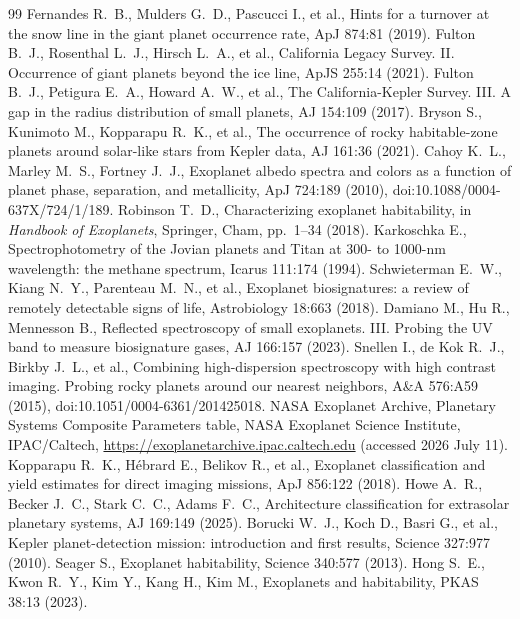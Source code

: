 \begin{thebibliography}{99}
 Fernandes R.~B., Mulders G.~D., Pascucci I., et al., Hints for a turnover at the snow line in the giant planet occurrence rate, ApJ 874:81 (2019).
 Fulton B.~J., Rosenthal L.~J., Hirsch L.~A., et al., California Legacy Survey. II. Occurrence of giant planets beyond the ice line, ApJS 255:14 (2021).
 Fulton B.~J., Petigura E.~A., Howard A.~W., et al., The California-Kepler Survey. III. A gap in the radius distribution of small planets, AJ 154:109 (2017).
 Bryson S., Kunimoto M., Kopparapu R.~K., et al., The occurrence of rocky habitable-zone planets around solar-like stars from Kepler data, AJ 161:36 (2021).
 Cahoy K.~L., Marley M.~S., Fortney J.~J., Exoplanet albedo spectra and colors as a function of planet phase, separation, and metallicity, ApJ 724:189 (2010), doi:10.1088/0004-637X/724/1/189.
 Robinson T.~D., Characterizing exoplanet habitability, in \emph{Handbook of Exoplanets}, Springer, Cham, pp.~1--34 (2018).
 Karkoschka E., Spectrophotometry of the Jovian planets and Titan at 300- to 1000-nm wavelength: the methane spectrum, Icarus 111:174 (1994).
 Schwieterman E.~W., Kiang N.~Y., Parenteau M.~N., et al., Exoplanet biosignatures: a review of remotely detectable signs of life, Astrobiology 18:663 (2018).
 Damiano M., Hu R., Mennesson B., Reflected spectroscopy of small exoplanets. III. Probing the UV band to measure biosignature gases, AJ 166:157 (2023).
 Snellen I., de Kok R.~J., Birkby J.~L., et al., Combining high-dispersion spectroscopy with high contrast imaging. Probing rocky planets around our nearest neighbors, A\&A 576:A59 (2015), doi:10.1051/0004-6361/201425018.
 NASA Exoplanet Archive, Planetary Systems Composite Parameters table, NASA Exoplanet Science Institute, IPAC/Caltech, \url{https://exoplanetarchive.ipac.caltech.edu} (accessed 2026 July 11).
 Kopparapu R.~K., H\'{e}brard E., Belikov R., et al., Exoplanet classification and yield estimates for direct imaging missions, ApJ 856:122 (2018).
 Howe A.~R., Becker J.~C., Stark C.~C., Adams F.~C., Architecture classification for extrasolar planetary systems, AJ 169:149 (2025).
 Borucki W.~J., Koch D., Basri G., et al., Kepler planet-detection mission: introduction and first results, Science 327:977 (2010).
 Seager S., Exoplanet habitability, Science 340:577 (2013).
 Hong S.~E., Kwon R.~Y., Kim Y., Kang H., Kim M., Exoplanets and habitability, PKAS 38:13 (2023).

\end{thebibliography}
